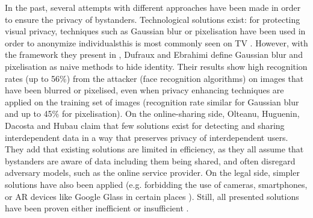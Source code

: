 \documentclass[conference]{IEEEtran}
\begin{document}
In the past, several attempts with different approaches have been made in order to ensure the privacy of bystanders. Technological solutions exist: for protecting visual privacy, techniques such as Gaussian blur or pixelisation have been used in order to anonymize individuals\textemdash this is most commonly seen on TV \cite{dufaux2010framework}. However, with the framework they present in \cite{dufaux2010framework}, Dufraux and Ebrahimi define Gaussian blur and pixelisation as naive methods to hide identity. Their results show high recognition rates (up to 56\%) from the attacker (face recognition algorithms) on images that have been blurred or pixelised, even when privacy enhancing techniques are applied on the training set of images (recognition rate similar for Gaussian blur and up to 45\% for pixelisation). On the online-sharing side, Olteanu, Huguenin, Dacosta and Hubau \cite{olteanu2018consensual} claim that few solutions exist for detecting and sharing interdependent data in a way that preserves privacy of interdependent users. They add that existing solutions are limited in efficiency, as they all assume that bystanders are aware of data including them being shared, and often disregard adversary models, such as the online service provider. On the legal side, simpler solutions have also been applied (e.g. forbidding the use of cameras, smartphones, or \ac{AR} devices like Google Glass in certain places \cite{shu2016cardea}). Still, all presented solutions have been proven either inefficient or insufficient \cite{shu2016cardea, olteanu2018consensual, dufaux2010framework}. 
\end{document}
